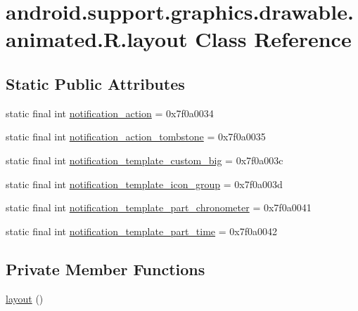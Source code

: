 \hypertarget{classandroid_1_1support_1_1graphics_1_1drawable_1_1animated_1_1_r_1_1layout}{}\section{android.\+support.\+graphics.\+drawable.\+animated.\+R.\+layout Class Reference}
\label{classandroid_1_1support_1_1graphics_1_1drawable_1_1animated_1_1_r_1_1layout}
\subsection*{Static Public Attributes}
\begin{DoxyCompactItemize}
\item 
static final int \mbox{\hyperlink{classandroid_1_1support_1_1graphics_1_1drawable_1_1animated_1_1_r_1_1layout_ab6a7ce2bec7c419bd056344980a2bfe4}{notification\+\_\+action}} = 0x7f0a0034
\item 
static final int \mbox{\hyperlink{classandroid_1_1support_1_1graphics_1_1drawable_1_1animated_1_1_r_1_1layout_ad267220bf2614e287a423c9daae9d5ba}{notification\+\_\+action\+\_\+tombstone}} = 0x7f0a0035
\item 
static final int \mbox{\hyperlink{classandroid_1_1support_1_1graphics_1_1drawable_1_1animated_1_1_r_1_1layout_a91cd88a6160b017d7b1e33d028625488}{notification\+\_\+template\+\_\+custom\+\_\+big}} = 0x7f0a003c
\item 
static final int \mbox{\hyperlink{classandroid_1_1support_1_1graphics_1_1drawable_1_1animated_1_1_r_1_1layout_af7a9952feddc7fe876e7cf9cf469b843}{notification\+\_\+template\+\_\+icon\+\_\+group}} = 0x7f0a003d
\item 
static final int \mbox{\hyperlink{classandroid_1_1support_1_1graphics_1_1drawable_1_1animated_1_1_r_1_1layout_a11d27386cb41f01081c07de501f821a2}{notification\+\_\+template\+\_\+part\+\_\+chronometer}} = 0x7f0a0041
\item 
static final int \mbox{\hyperlink{classandroid_1_1support_1_1graphics_1_1drawable_1_1animated_1_1_r_1_1layout_a58ea2615a1760f93ef687e8c1db58feb}{notification\+\_\+template\+\_\+part\+\_\+time}} = 0x7f0a0042
\end{DoxyCompactItemize}
\subsection*{Private Member Functions}
\begin{DoxyCompactItemize}
\item 
\mbox{\hyperlink{classandroid_1_1support_1_1graphics_1_1drawable_1_1animated_1_1_r_1_1layout_a6044f0738bc43d7db66ec3bd043af088}{layout}} ()
\end{DoxyCompactItemize}



